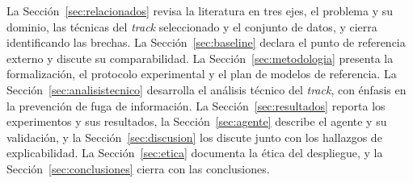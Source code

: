 La Sección~\ref{sec:relacionados} revisa la literatura en tres ejes, el
problema y su dominio, las técnicas del \textit{track} seleccionado y el
conjunto de datos, y cierra identificando las brechas. La
Sección~\ref{sec:baseline} declara el punto de referencia externo y discute
su comparabilidad. La Sección~\ref{sec:metodologia} presenta la
formalización, el protocolo experimental y el plan de modelos de referencia.
La Sección~\ref{sec:analisistecnico} desarrolla el análisis técnico del
\textit{track}, con énfasis en la prevención de fuga de información. La
Sección~\ref{sec:resultados} reporta los experimentos y sus resultados, la
Sección~\ref{sec:agente} describe el agente y su validación, y la
Sección~\ref{sec:discusion} los discute junto con los hallazgos de
explicabilidad. La Sección~\ref{sec:etica} documenta la ética del
despliegue, y la Sección~\ref{sec:conclusiones} cierra con las conclusiones.
